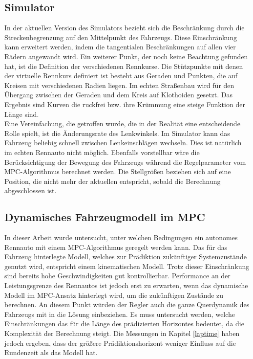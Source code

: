 \documentclass{like}
\begin{document}
\subsection{Simulator}
In der aktuellen Version des Simulators bezieht sich die Beschränkung durch die Streckenbegrenzung auf den Mittelpunkt des Fahrzeugs. Diese Einschränkung kann erweitert werden, indem die tangentialen Beschränkungen auf allen vier Rädern angewandt wird. Ein weiterer Punkt, der noch keine Beachtung gefunden hat, ist die Definition der verschiedenen Rennkurse. Die Stützpunkte mit denen der virtuelle Rennkurs definiert ist besteht aus Geraden und Punkten, die auf Kreisen mit verschiedenen Radien liegen. Im echten Straßenbau wird für den Übergang zwischen der Geraden und dem Kreis auf Klothoiden gesetzt. Das Ergebnis sind Kurven die ruckfrei bzw. ihre Krümmung eine steige Funktion der Länge sind. \\
Eine Vereinfachung, die getroffen wurde, die in der Realität eine entscheidende Rolle spielt, ist die Änderungsrate des Lenkwinkels. Im Simulator kann das Fahrzeug beliebig schnell zwischen Lenkeinschlägen wechseln. Dies ist natürlich im echten Rennauto nicht möglich. Ebenfalls vorstellbar wäre die Berücksichtigung der Bewegung des Fahrzeugs während die Regelparameter vom \ac{MPC}-Algorithmus berechnet werden. Die Stellgrößen beziehen sich auf eine Position, die nicht mehr der aktuellen entspricht, sobald die Berechnung abgeschlossen ist.

\subsection{Dynamisches Fahrzeugmodell im MPC}
In dieser Arbeit wurde untersucht, unter welchen Bedingungen ein autonomes Rennauto mit einem \ac{MPC}-Algorithmus geregelt werden kann. Das für das Fahrzeug hinterlegte Modell, welches zur Prädiktion zukünftiger Systemzustände genutzt wird, entspricht einem kinematischen Modell. Trotz dieser Einschränkung sind bereits hohe Geschwindigkeiten gut kontrollierbar. Performance an der Leistungsgrenze des Rennautos ist jedoch erst zu erwarten, wenn das dynamische Modell im \ac{MPC}-Ansatz hinterlegt wird, um die zukünftigen Zustände zu berechnen. An diesem Punkt würden der Regler auch die ganze Querdynamik des Fahrzeugs mit in die Lösung einbeziehen. Es muss untersucht werden, welche Einschränkungen das für die Länge des prädizierten Horizontes bedeutet, da die Komplexität der Berechnung steigt. Die Messungen in Kapitel \ref{laptime} haben jedoch ergeben, dass der größere Prädiktionshorizont weniger Einfluss auf die Rundenzeit als das Modell hat.
\end{document}
